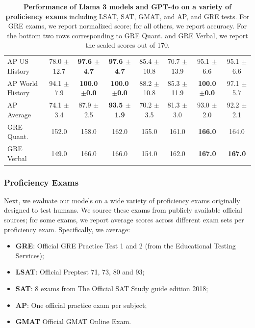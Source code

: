 \documentclass[dvipsnames]{fairmeta}
\begin{document}
\begin{table}[t]
\begin{NiceTabular}{lccccccc}
AP US History & 78.0 \scriptsize{$\pm$12.7} & \textbf{97.6 \scriptsize{$\pm$4.7}} & \textbf{97.6 \scriptsize{$\pm$4.7}} & 85.4 \scriptsize{$\pm$10.8} & 70.7 \scriptsize{$\pm$13.9} & 95.1 \scriptsize{$\pm$6.6} & 95.1 \scriptsize{$\pm$6.6} \\
AP World History & 94.1 \scriptsize{$\pm$7.9} & \textbf{100.0 \scriptsize{$\pm$0.0}} & \textbf{100.0 \scriptsize{$\pm$0.0}} & 88.2 \scriptsize{$\pm$10.8} & 85.3 \scriptsize{$\pm$11.9} & \textbf{100.0 \scriptsize{$\pm$0.0}} & 97.1 \scriptsize{$\pm$5.7} \\
AP Average & 74.1 \scriptsize{$\pm$3.4} & 87.9 \scriptsize{$\pm$2.5} & \textbf{93.5 \scriptsize{$\pm$1.9}} & 70.2 \scriptsize{$\pm$3.5} & 81.3 \scriptsize{$\pm$3.0} & 93.0 \scriptsize{$\pm$2.0} & 92.2 \scriptsize{$\pm$2.1} \\
\midrule
GRE Quant. & 152.0 & 158.0 & 162.0 & 155.0 & 161.0 & \textbf{166.0} & 164.0 \\
GRE Verbal & 149.0 & 166.0 & 166.0 & 154.0 & 162.0 & \textbf{167.0} & \textbf{167.0} \\
    \bottomrule
    \end{NiceTabular}
 \caption{\textbf{Performance of Llama 3 models and GPT-4o on a variety of proficiency exams} including LSAT, SAT, GMAT, and AP, and GRE tests. For GRE exams, we report normalized score; for all others, we report accuracy. For the bottom two rows corresponding to GRE Quant. and GRE Verbal, we report the scaled scores out of 170.}
    \label{table:proficiency_exam_results}
\end{table}

\subsubsection{Proficiency Exams}
\label{subsec:proficiency}

Next, we evaluate our models on a wide variety of proficiency exams originally designed to test humans.
We source these exams from publicly available official sources; for some exams, we report average scores across different exam sets per proficiency exam.
Specifically, we average:\begin{itemize}
    \item \textbf{GRE}: Official GRE Practice Test 1 and 2 (from the Educational Testing Services);
    \item \textbf{LSAT}: Official Preptest 71, 73, 80 and 93;
    \item \textbf{SAT}: 8 exams from The Official SAT Study guide edition 2018;
    \item \textbf{AP}: One official practice exam per subject;
    \item \textbf{GMAT} Official GMAT Online Exam.
\end{itemize}
\end{document}
